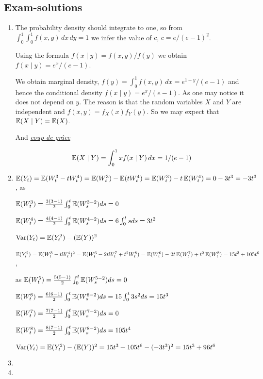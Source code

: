 \documentclass[12pt, a4paper]{article}
\begin{document}
\subsection{Exam-solutions}
\begin{enumerate}
\item The probability density should integrate to one, so from $\int_0^1 \int_0^1 f(x,y) \, dx\, dy=1$ we infer the value of $c$, $c=e/(e-1)^2$.

Using the formula $f(x \mid y)=f(x,y)/f(y)$ we obtain $f(x \mid y)=e^x/(e-1)$.

We obtain marginal density, $f(y)=\int_0^1 f(x,y) \, dx= e^{1-y}/(e-1)$ and hence the conditional density $f(x \mid y)=e^x/(e-1)$. As one may notice it does not depend on $y$. The reason is that the random variables $X$ and $Y$ are independent and $f(x,y)=f_X(x)f_Y(y)$. So we may expect that $\operatorname{\mathbb{E}}(X \mid Y)=\operatorname{\mathbb{E}}(X)$.

And \href{http://en.wikipedia.org/wiki/Coup_de_gr%C3%A2ce}{\textit{coup de grâce}}

\[
\operatorname{\mathbb{E}}(X \mid Y)=\int_0^1 x f(x \mid Y) \, dx = 1/(e-1)
\]


\item $\operatorname{\mathbb{E}}(Y_t)=\operatorname{\mathbb{E}}(W^3_t-tW^4_t) = \operatorname{\mathbb{E}}(W^3_t)-\operatorname{\mathbb{E}}(tW^4_t) = \operatorname{\mathbb{E}}(W^3_t)-t \operatorname{\mathbb{E}}(W^4_t)= 0 - 3t^3 = - 3t^3 $, as

$\operatorname{\mathbb{E}}(W^{3}_{t})= \frac{3(3-1)}{2} \int_0^{t} \operatorname{\mathbb{E}} (W^{3-2}_{s}) ds = 0 $

$\operatorname{\mathbb{E}}(W^{4}_{t})= \frac{4(4-1)}{2} \int_0^{t} \operatorname{\mathbb{E}} (W^{4-2}_{s}) ds = 6 \int_0^{t} s ds =3 t^2 $

$\operatorname{Var}(Y_t) =\operatorname{\mathbb{E}}(Y^2_t)-(\operatorname{\mathbb{E}}(Y))^2$

$\operatorname{\mathbb{E}}(Y^2_t)=\operatorname{\mathbb{E}}(W^3_t-tW^4_t)^2=\operatorname{\mathbb{E}}(W^6_t-2tW^7_t+t^2 W^8_t)= \operatorname{\mathbb{E}}(W^6_t)-2t\operatorname{\mathbb{E}}(W^7_t)+t^2 \operatorname{\mathbb{E}}(W^8_t) = 15t^3 + 105t^6$,

as $\operatorname{\mathbb{E}}(W^{5}_{t})= \frac{5(5-1)}{2} \int_0^{t} \operatorname{\mathbb{E}} (W^{5-2}_{s}) ds = 0 $

$\operatorname{\mathbb{E}}(W^{6}_{t})= \frac{6(6-1)}{2} \int_0^{t} \operatorname{\mathbb{E}} (W^{6-2}_{s}) ds = 15 \int_0^{t} 3s^2 ds= 15t^3 $

$\operatorname{\mathbb{E}}(W^{7}_{t})= \frac{7(7-1)}{2} \int_0^{t} \operatorname{\mathbb{E}} (W^{7-2}_{s}) ds = 0 $

$\operatorname{\mathbb{E}}(W^{8}_{t})= \frac{8(7-1)}{2} \int_0^{t} \operatorname{\mathbb{E}} (W^{8-2}_{s}) ds = 105t^4 $

$\operatorname{Var}(Y_t) =\operatorname{\mathbb{E}}(Y^2_t)-(\operatorname{\mathbb{E}}(Y))^2 = 15t^3 + 105t^6 - (-3t^3)^2= 15t^3 + 96 t^6$

\item

\item


\end{enumerate}
\end{document}

